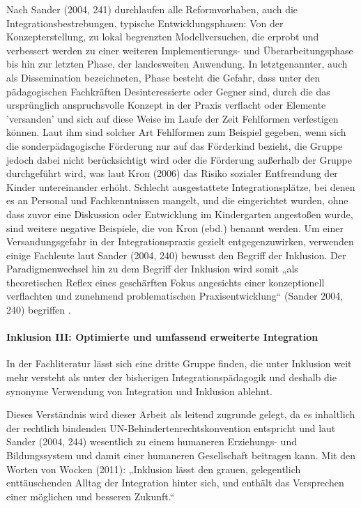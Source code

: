 Nach Sander (2004, 241) durchlaufen alle Reformvorhaben, auch die Integrationsbestrebungen, typische Entwicklungsphasen: Von der Konzepterstellung, zu lokal begrenzten Modellversuchen, die erprobt und verbessert werden zu einer weiteren Implementierungs- und Überarbeitungsphase bis hin zur letzten Phase, der landesweiten Anwendung. In letztgenannter, auch als Dissemination bezeichneten, Phase besteht die Gefahr, dass unter den pädagogischen Fachkräften Desinteressierte oder Gegner sind, durch die das ursprünglich anspruchsvolle Konzept in der Praxis verflacht oder Elemente 'versanden' und sich auf diese Weise im Laufe der Zeit Fehlformen verfestigen können. Laut ihm sind solcher Art Fehlformen zum Beispiel gegeben, wenn sich die  sonderpädagogische Förderung nur auf das Förderkind bezieht, die Gruppe jedoch dabei nicht berücksichtigt wird oder die Förderung außerhalb der Gruppe durchgeführt wird, was laut Kron (2006) das Risiko sozialer Entfremdung der Kinder untereinander erhöht. Schlecht ausgestattete Integrationsplätze, bei denen es an Personal und Fachkenntnissen mangelt, und die eingerichtet wurden, ohne dass zuvor eine Diskussion oder Entwicklung im Kindergarten angestoßen wurde, sind weitere negative Beispiele, die von Kron (ebd.) benannt werden. Um einer Versandungsgefahr in der Integrationspraxis gezielt entgegenzuwirken, verwenden einige Fachleute laut Sander (2004, 240) bewusst den Begriff der Inklusion. Der Paradigmenwechsel hin zu dem Begriff der Inklusion wird somit „als theoretischen Reflex eines geschärften Fokus angesichts einer konzeptionell verflachten und zunehmend problematischen Praxisentwicklung“ (Sander 2004, 240) begriffen . 

\paragraph{Inklusion III: Optimierte und umfassend erweiterte Integration}

In der Fachliteratur lässt sich eine dritte Gruppe finden, die unter Inklusion weit mehr versteht als unter der bisherigen Integrationspädagogik und deshalb die synonyme Verwendung von Integration und Inklusion ablehnt. 

Dieses Verständnis wird dieser Arbeit als leitend zugrunde gelegt, da es inhaltlich der rechtlich bindenden UN-Behindertenrechtskonvention entspricht und laut Sander (2004, 244) wesentlich zu einem humaneren Erziehungs- und Bildungssystem und damit einer humaneren Gesellschaft beitragen kann. Mit den Worten von Wocken (2011): „Inklusion lässt den grauen, gelegentlich enttäuschenden Alltag der Integration hinter sich, und enthält das Versprechen einer möglichen und besseren Zukunft.“ 

